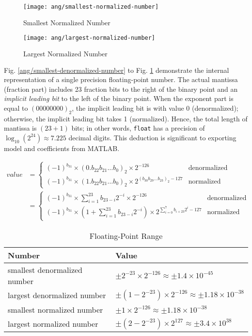 \begin{figure}[H]
\begin{minipage}[t]{0.5\linewidth}
\centering
\texttt{[image: ang/smallest-normalized-number]}
\caption{Smallest Normalized Number}
\label{ang/smallest-normalized-number}
\end{minipage}
\begin{minipage}[t]{0.5\linewidth}
\centering
\texttt{[image: ang/largest-normalized-number]}
\caption{Largest Normalized Number}
\label{ang/largest-normalized-number}
\end{minipage}
\end{figure}

Fig. \ref{ang/smallest-denormalized-number} to Fig. \ref{ang/largest-normalized-number} demonstrate the internal representation of a single precision floating-point number. The actual mantissa (fraction part) includes 23 fraction bits to the right of the binary point and an \textit{implicit leading bit} to the left of the binary point. When the exponent part is equal to $(00000000)_2$, the implicit leading bit is with value 0 (denormalized); otherwise, the implicit leading bit takes 1 (normalized). Hence, the total length of mantissa is $(23 + 1)$ bits; in other words, \texttt{float} has a precision of $\log_{10}(2^{24}) \approx 7.225$ decimal digits. This deduction is significant to exporting model and coefficients from MATLAB.

\begin{align}
value &=
\begin{cases}
(-1)^{b_{31}} \times (0.b_{22}b_{21} \dots b_{0})_2 \times 2^{- 126} &\text{denormalized}\\
(-1)^{b_{31}} \times (1.b_{22}b_{21} \dots b_{0})_2 \times 2^{(b_{30}b_{29} \dots b_{23})_2 - 127} &\text{normalized}
\end{cases}\\
&=
\begin{cases}
(-1)^{b_{31}} \times \sum_{i=1}^{23} b_{23-i} 2^{-i} \times 2^{- 126} &\text{denormalized}\\
(-1)^{b_{31}} \times ( 1 + \sum_{i=1}^{23} b_{23-i} 2^{-i} ) \times 2^{\sum_{i=0}^{7} b_{i+23} 2^i - 127} &\text{normalized}
\end{cases}
\end{align}

\begin{table}[H]
\centering
\begin{tabu} to \textwidth {XX}
\toprule
Number &Value\\
\hline
smallest denormalized number &$\pm 2^{-23} \times 2^{-126} \approx \pm 1.4 \times 10^{-45}$\\
\hline
largest denormalized number &$\pm (1-2^{-23}) \times 2^{-126} \approx \pm 1.18 \times 10^{-38}$\\
\hline
smallest normalized number &$\pm 1 \times 2^{-126} \approx \pm 1.18 \times 10^{-38}$\\
\hline
largest normalized number &$\pm (2-2^{-23}) \times 2^{127} \approx \pm 3.4 \times 10^{38}$\\
\bottomrule
\end{tabu}
\caption{Floating-Point Range}
\label{floating-point-range}
\end{table}

